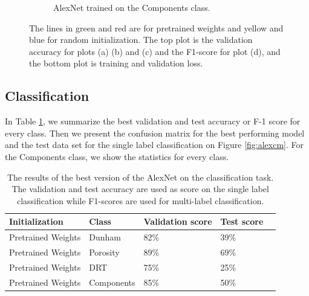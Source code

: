 \begin{figure}
\begin{subfigure}{.6\textwidth}
  \caption{AlexNet trained on the Components class.}
  \label{fig:alexinit_compo}
\end{subfigure}
\caption[Training and validation plots for AlexNet]{The lines in green and red are for pretrained weights and yellow and blue for random initialization. The top plot is the validation accuracy for plots (a) (b) and (c) and the F1-score for plot (d), and the bottom plot is training  and validation loss.}
\label{fig:plotsalex}
\end{figure}

\subsection{Classification}
In Table \ref{tab:alexbest}, we summarize the best validation and test accuracy or F-1 score for every class. Then we present the confusion matrix for the best performing model and the test data set for the single label classification on Figure \ref{fig:alexcm}. For the Components class, we show the statistics for every class. 

\begin{table}
\caption{\label{tab:alexbest} The results of the best version of the AlexNet on the classification task. The validation and test accuracy are used as score on the single label classification while F1-scores are used for multi-label classification.}
\centering
\begin{tabular}[b]{| l | l | l | l | l |}
\hline
    Initialization & Class & Validation score & Test score  \\ \hline
    Pretrained Weights & Dunham &  82\%  & 39\% \\ \hline
    Pretrained Weights & Porosity & 89\%  &  69\% \\ \hline
    Pretrained Weights &DRT & 75\% &  25\% \\ \hline
    Pretrained Weights &Components & 85\% &  50\% \\ \hline
\end{tabular} 
\end{table}


